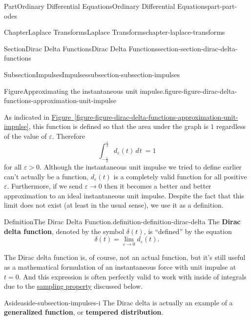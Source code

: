 \documentclass[twoside,10pt,]{book}
\newcommand{\xreffont}{\relax}
\newcommand{\terminology}[1]{\textbf{#1}}
\numberwithin{equation}{part}
\newcommand{\limit}[2]{\lim_{#1\to#2}}
\newcommand{\dd}[2][]{\, d^{#1} #2\ }
\begin{document}
\begin{partptx}{Part}{Ordinary Differential Equations}{}{Ordinary Differential Equations}{}{}{part-part-odes}
\begin{chapterptx}{Chapter}{Laplace Transforms}{}{Laplace Transforms}{}{}{chapter-laplace-transforms}
\begin{sectionptx}{Section}{Dirac Delta Functions}{}{Dirac Delta Functions}{}{}{section-section-dirac-delta-functions}
\begin{subsectionptx}{Subsection}{Impulses}{}{Impulses}{}{}{subsection-subsection-impulses}
\begin{figureptx}{Figure}{Approximating the instantaneous unit impulse.}{figure-figure-dirac-delta-functions-approximation-unit-impulse}{}
\begin{image}{0.2}{0.6}{0.2}{}
{
}%
\end{image}%
\tcblower
\end{figureptx}%
As indicated in \hyperref[figure-figure-dirac-delta-functions-approximation-unit-impulse]{Figure~{\xreffont\ref{figure-figure-dirac-delta-functions-approximation-unit-impulse}}}, this function is defined so that the area under the graph is \(1\) regardless of the value of \(\varepsilon\). Therefore%
\begin{equation*}
\int_{-\frac{\varepsilon}{2}}^{\frac{\varepsilon}{2}}d_{\varepsilon}(t)\dd{t} = 1
\end{equation*}
for all \(\varepsilon > 0\). Although the instantaneous unit impulse we tried to define earlier can't actually be a function, \(d_{\varepsilon}(t)\) is a completely valid function for all positive \(\varepsilon\). Furthermore, if we send \(\varepsilon\to0\) then it becomes a better and better approximation to an ideal instantaneous unit impulse. Despite the fact that this limit does not exist (at least in the usual sense), we use it as a definition.%
\begin{definition}{Definition}{The Dirac Delta Function.}{definition-definition-dirac-delta}%
%
The \terminology{Dirac delta function}, denoted by the symbol \(\delta(t)\), is ``defined'' by the equation%
\begin{equation*}
\delta(t) = \limit{\varepsilon}{0}d_{\varepsilon}(t).
\end{equation*}
%
\end{definition}
The Dirac delta function is, of course, not an actual function, but it's still useful as a mathematical formulation of an instantaneous force with unit impulse at \(t=0\). And this expression is often perfectly valid to work with inside of integrals due to the \hyperref[theorem-theorem-sifting-property]{sampling property} discussed below.%
\begin{aside}{Aside}{}{aside-subsection-impulses-i}%
The Dirac delta is actually an example of a \terminology{generalized function}, or \terminology{tempered distribution}.%
\end{aside}

\end{subsectionptx}
\end{sectionptx}
\end{chapterptx}
\end{partptx}
\end{document}
